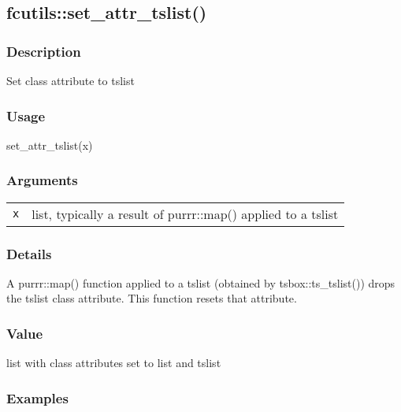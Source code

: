 \documentclass[
  letterpaper,
  DIV=11,
  numbers=noendperiod]{scrreport}
\newenvironment{Shaded}{\begin{snugshade}}{\end{snugshade}}
\newcommand{\FunctionTok}[1]{\textcolor[rgb]{0.28,0.35,0.67}{#1}}
\newcommand{\NormalTok}[1]{\textcolor[rgb]{0.00,0.23,0.31}{#1}}
\begin{document}
\subsection{fcutils::set\_attr\_tslist()}\label{fcutilsset_attr_tslist}

\subsubsection{Description}\label{description-54}

Set class attribute to tslist

\subsubsection{Usage}\label{usage-54}

\begin{Shaded}
\begin{Highlighting}[]
\FunctionTok{set\_attr\_tslist}\NormalTok{(x)}
\end{Highlighting}
\end{Shaded}

\subsubsection{Arguments}\label{arguments-54}

\begin{longtable}[]{@{}ll@{}}
\toprule\noalign{}
\endhead
\bottomrule\noalign{}
\endlastfoot
\texttt{x} & list, typically a result of purrr::map() applied to a
tslist \\
\end{longtable}

\subsubsection{Details}\label{details-16}

A purrr::map() function applied to a tslist (obtained by
tsbox::ts\_tslist()) drops the tslist class attribute. This function
resets that attribute.

\subsubsection{Value}\label{value-54}

list with class attributes set to list and tslist

\subsubsection{Examples}\label{examples-54}
\end{document}
